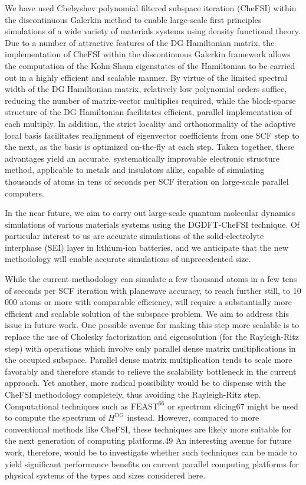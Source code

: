 \documentclass[
  10
]{article}
\begin{document}
We have used Chebyshev polynomial filtered subspace iteration (CheFSI)
within the discontinuous Galerkin method to enable large-scale first
principles simulations of a wide variety of materials systems using
density functional theory. Due to a number of attractive features of the
DG Hamiltonian matrix, the implementation of CheFSI within the
discontinuous Galerkin framework allows the computation of the Kohn-Sham
eigenstates of the Hamiltonian to be carried out in a highly efficient
and scalable manner. By virtue of the limited spectral width of the DG
Hamiltonian matrix, relatively low polynomial orders suffice, reducing
the number of matrix-vector multiplies required, while the block-sparse
structure of the DG Hamiltonian facilitates efficient, parallel
implementation of each multiply. In addition, the strict locality and
orthonormality of the adaptive local basis facilitates realignment of
eigenvector coefficients from one SCF step to the next, as the basis is
optimized on-the-fly at each step. Taken together, these advantages
yield an accurate, systematically improvable electronic structure
method, applicable to metals and insulators alike, capable of simulating
thousands of atoms in tens of seconds per SCF iteration on large-scale
parallel computers.

In the near future, we aim to carry out large-scale quantum molecular
dynamics simulations of various materials systems using the DGDFT-CheFSI
technique. Of particular interest to us are accurate simulations of the
solid-electrolyte interphase (SEI) layer in lithium-ion batteries, and
we anticipate that the new methodology will enable accurate simulations
of unprecedented size.

While the current methodology can simulate a few thousand atoms in a few
tens of seconds per SCF iteration with planewave accuracy, to reach
further still, to 10 000 atoms or more with comparable efficiency, will
require a substantially more efficient and scalable solution of the
subspace problem. We aim to address this issue in future work. One
possible avenue for making this step more scalable is to replace the use
of Cholesky factorization and eigensolution (for the Rayleigh-Ritz step)
with operations which involve only parallel dense matrix multiplications
in the occupied subspace. Parallel dense matrix multiplication tends to
scale more favorably and therefore stands to relieve the scalability
bottleneck in the current approach. Yet another, more radical
possibility would be to dispense with the CheFSI methodology completely,
thus avoiding the Rayleigh-Ritz step. Computational techniques such as
\(\mathrm { F E A S T } ^ { 6 6 }\) or spectrum slicing67 might be used
to compute the spectrum of \(H ^ { \mathrm { D G } }\) instead. However,
compared to more conventional methods like CheFSI, these techniques are
likely more suitable for the next generation of computing platforms.49
An interesting avenue for future work, therefore, would be to
investigate whether such techniques can be made to yield significant
performance benefits on current parallel computing platforms for
physical systems of the types and sizes considered here.
\end{document}
